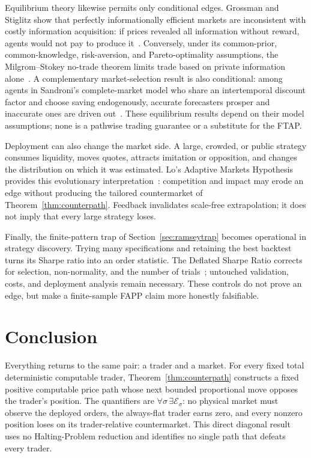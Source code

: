 \documentclass[aps,pra,reprint,superscriptaddress,amsmath,amssymb,floatfix]{revtex4-2}
\theoremstyle{plain}
\theoremstyle{definition}
\theoremstyle{remark}
\begin{document}
Equilibrium theory likewise permits only conditional edges. Grossman and
Stiglitz show that perfectly informationally efficient markets are inconsistent
with costly information acquisition: if prices revealed all information
without reward, agents would not pay to produce it~\cite{GrossmanStiglitz1980}.
Conversely, under its common-prior, common-knowledge, risk-aversion, and
Pareto-optimality assumptions, the Milgrom--Stokey no-trade theorem limits trade
based on private information alone~\cite{MilgromStokey1982}. A complementary
market-selection result is also conditional: among agents in Sandroni's
complete-market model who share an intertemporal discount factor and choose
saving endogenously, accurate forecasters prosper and inaccurate ones are driven
out~\cite{Sandroni2000}. These equilibrium results depend on their model
assumptions; none is a pathwise trading guarantee or a substitute for the FTAP.

Deployment can also change the market side. A large, crowded, or public
strategy consumes liquidity, moves quotes, attracts imitation or opposition,
and changes the distribution on which it was estimated. Lo's Adaptive Markets
Hypothesis provides this evolutionary interpretation~\cite{Lo2004}: competition
and impact may erode an edge without producing the tailored countermarket of
Theorem~\ref{thm:counterpath}. Feedback invalidates scale-free extrapolation; it
does not imply that every large strategy loses.

Finally, the finite-pattern trap of Section~\ref{sec:ramseytrap} becomes
operational in strategy discovery. Trying many specifications and retaining the
best backtest turns its Sharpe ratio into an order statistic. The Deflated
Sharpe Ratio corrects for selection, non-normality, and the number of
trials~\cite{BaileyLopez2014}; untouched validation, costs, and deployment
analysis remain necessary. These controls do not prove an edge, but make a
finite-sample FAPP claim more honestly falsifiable.

\section{Conclusion}
\label{sec:conclusion}

Everything returns to the same pair: a trader and a market. For every fixed
total deterministic computable trader, Theorem~\ref{thm:counterpath} constructs
a fixed positive computable price path whose next bounded proportional move
opposes the trader's position. The quantifiers are
\(\forall\sigma\,\exists\mathcal E_\sigma\): no physical market must observe
the deployed orders, the always-flat trader earns zero, and every nonzero
position loses on its trader-relative countermarket. This direct diagonal
result uses no Halting-Problem reduction and identifies no single path that
defeats every trader.
\end{document}

